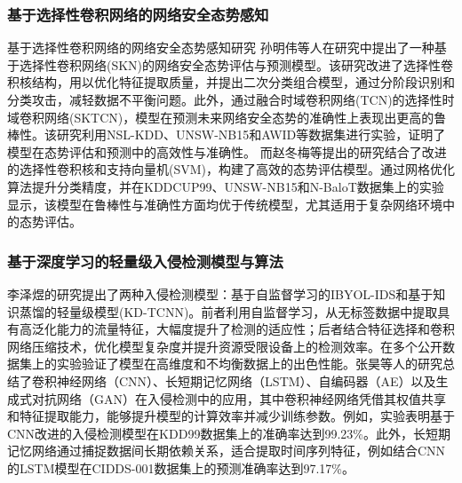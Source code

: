 \subsubsection{基于选择性卷积网络的网络安全态势感知}
基于选择性卷积网络的网络安全态势感知研究 孙明伟等人在研究中提出了一种基于选择性卷积网络(SKN)的网络安全态势评估与预测模型\cite{宋会倩2021基于卷积神经网络的网络安全态势感知研究}。该研究改进了选择性卷积核结构，用以优化特征提取质量，并提出二次分类组合模型，通过分阶段识别和分类攻击，减轻数据不平衡问题。此外，通过融合时域卷积网络(TCN)的选择性时域卷积网络(SKTCN)，模型在预测未来网络安全态势的准确性上表现出更高的鲁棒性。该研究利用NSL-KDD、UNSW-NB15和AWID等数据集进行实验，证明了模型在态势评估和预测中的高效性与准确性。
而赵冬梅等提出的研究结合了改进的选择性卷积核和支持向量机(SVM)\cite{SVM的网络安全态势评估}，构建了高效的态势评估模型。通过网格优化算法提升分类精度，并在KDDCUP99、UNSW-NB15和N-BaloT数据集上的实验显示，该模型在鲁棒性与准确性方面均优于传统模型，尤其适用于复杂网络环境中的态势评估​。
\subsubsection{基于深度学习的轻量级入侵检测模型与算法}
李泽煜的研究提出了两种入侵检测模型\cite{1023744319.nh}：基于自监督学习的IBYOL-IDS和基于知识蒸馏的轻量级模型(KD-TCNN)。前者利用自监督学习，从无标签数据中提取具有高泛化能力的流量特征，大幅度提升了检测的适应性；后者结合特征选择和卷积网络压缩技术，优化模型复杂度并提升资源受限设备上的检测效率。在多个公开数据集上的实验验证了模型在高维度和不均衡数据上的出色性能。张昊等人的研究\cite{基于深度学习的入侵检测模型综述}总结了卷积神经网络（CNN）、长短期记忆网络（LSTM）、自编码器（AE）以及生成式对抗网络（GAN）在入侵检测中的应用，其中卷积神经网络凭借其权值共享和特征提取能力，能够提升模型的计算效率并减少训练参数。例如，实验表明基于CNN改进的入侵检测模型在KDD99数据集上的准确率达到99.23\%。此外，长短期记忆网络通过捕捉数据间长期依赖关系，适合提取时间序列特征，例如结合CNN的LSTM模型在CIDDS-001数据集上的预测准确率达到97.17\%。
